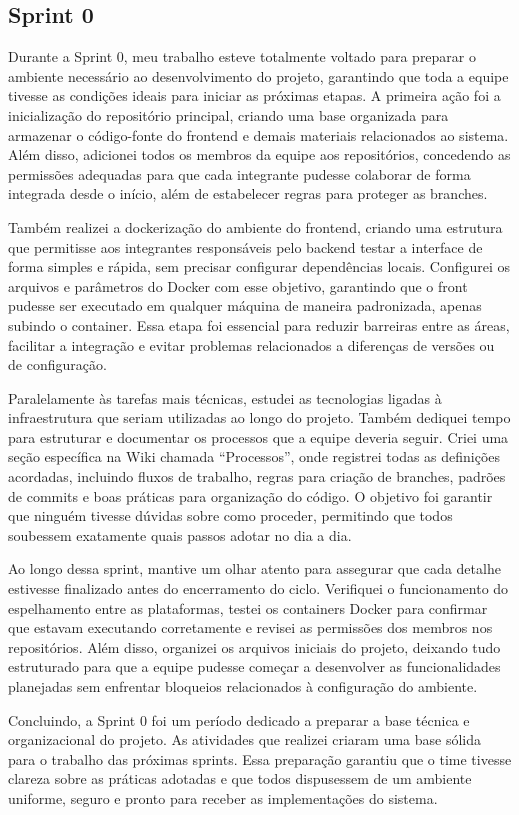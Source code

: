 \subsection{Sprint 0}

Durante a Sprint 0, meu trabalho esteve totalmente voltado para preparar o ambiente necessário ao desenvolvimento do projeto, garantindo que toda a equipe tivesse as condições ideais para iniciar as próximas etapas. A primeira ação foi a inicialização do repositório principal, criando uma base organizada para armazenar o código-fonte do frontend e demais materiais relacionados ao sistema. Além disso, adicionei todos os membros da equipe aos repositórios, concedendo as permissões adequadas para que cada integrante pudesse colaborar de forma integrada desde o início, além de estabelecer regras para proteger as branches.

Também realizei a dockerização do ambiente do frontend, criando uma estrutura que permitisse aos integrantes responsáveis pelo backend testar a interface de forma simples e rápida, sem precisar configurar dependências locais. Configurei os arquivos e parâmetros do Docker com esse objetivo, garantindo que o front pudesse ser executado em qualquer máquina de maneira padronizada, apenas subindo o container. Essa etapa foi essencial para reduzir barreiras entre as áreas, facilitar a integração e evitar problemas relacionados a diferenças de versões ou de configuração.

Paralelamente às tarefas mais técnicas, estudei as tecnologias ligadas à infraestrutura que seriam utilizadas ao longo do projeto. Também dediquei tempo para estruturar e documentar os processos que a equipe deveria seguir. Criei uma seção específica na Wiki chamada “Processos”, onde registrei todas as definições acordadas, incluindo fluxos de trabalho, regras para criação de branches, padrões de commits e boas práticas para organização do código. O objetivo foi garantir que ninguém tivesse dúvidas sobre como proceder, permitindo que todos soubessem exatamente quais passos adotar no dia a dia.

Ao longo dessa sprint, mantive um olhar atento para assegurar que cada detalhe estivesse finalizado antes do encerramento do ciclo. Verifiquei o funcionamento do espelhamento entre as plataformas, testei os containers Docker para confirmar que estavam executando corretamente e revisei as permissões dos membros nos repositórios. Além disso, organizei os arquivos iniciais do projeto, deixando tudo estruturado para que a equipe pudesse começar a desenvolver as funcionalidades planejadas sem enfrentar bloqueios relacionados à configuração do ambiente.

Concluindo, a Sprint 0 foi um período dedicado a preparar a base técnica e organizacional do projeto. As atividades que realizei criaram uma base sólida para o trabalho das próximas sprints. Essa preparação garantiu que o time tivesse clareza sobre as práticas adotadas e que todos dispusessem de um ambiente uniforme, seguro e pronto para receber as implementações do sistema.
